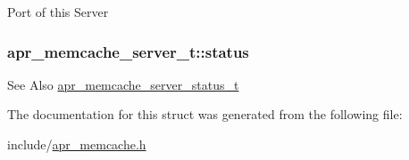 Port of this Server \hypertarget{structapr__memcache__server__t_a641c9cd95499a998ba2717ec5f03b174}{
\subsubsection[{status}]{ apr\-\_\-memcache\-\_\-server\-\_\-t\-::status}}\label{structapr__memcache__server__t_a641c9cd95499a998ba2717ec5f03b174}
\begin{DoxySeeAlso}{See Also}
\hyperlink{group___a_p_r___util___m_c_ga3b18c7c3f0ecabb930b78aa549c2e2e8}{apr\-\_\-memcache\-\_\-server\-\_\-status\-\_\-t} 
\end{DoxySeeAlso}


The documentation for this struct was generated from the following file\-:\begin{DoxyCompactItemize}
\item 
include/\hyperlink{apr__memcache_8h}{apr\-\_\-memcache.\-h}\end{DoxyCompactItemize}
